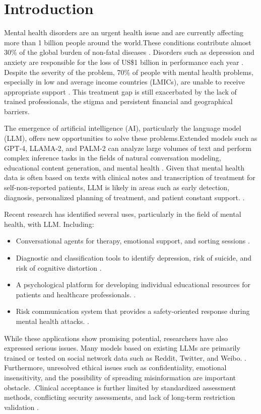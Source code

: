 \documentclass[journal]{IEEEtran}
\begin{document}
\section{Introduction}
Mental health disorders are an urgent health issue and are currently affecting more than 1 billion people around the world.These conditions contribute almost 30\% of the global burden of non-fatal diseases  \cite{WHO2022}. Disorders such as depression and anxiety are responsible for the loss of US\$1 billion in performance each year \cite{Hua2024}. Despite the severity of the problem, 70\% of people with mental health problems, especially in low and average income countries (LMICs), are unable to receive appropriate support \cite{Naslund2017}. This treatment gap is still exacerbated by the lack of trained professionals, the stigma and persistent financial and geographical barriers.

The emergence of artificial intelligence (AI), particularly the language model (LLM), offers new opportunities to solve these problems.Extended models such as GPT-4, LLAMA-2, and PALM-2 can analyze large volumes of text and perform complex inference tasks in the fields of natural conversation modeling, educational content generation, and mental health \cite{Hua2024b,JMIR2024}. Given that mental health data is often based on texts with clinical notes and transcription of treatment for self-non-reported patients, LLM is likely in areas such as early detection, diagnosis, personalized planning of treatment, and patient constant support. \cite{Ibrahimov2024,Olawade2024}.

Recent research has identified several uses, particularly in the field of mental health, with LLM. Including:
\begin{itemize}
    \item Conversational agents for therapy, emotional support, and sorting sessions  \cite{Ma2023,Liu2024,Hu2025}.
    \item Diagnostic and classification tools to identify depression, risk of suicide, and risk of cognitive distortion  \cite{Xu2024,Yang2024}.
    \item A psychological platform for developing individual educational resources for patients and healthcare professionals. \cite{Smith2023,Kumar2023}.
    \item Risk communication system that provides a safety-oriented response during mental health attacks. \cite{Hua2024b}.
\end{itemize}

While these applications show promising potential, researchers have also expressed serious issues. Many models based on existing LLMs are primarily trained or tested on social network data such as Reddit, Twitter, and Weibo. \cite{Hua2024,JMIR2024}. Furthermore, unresolved ethical issues such as confidentiality, emotional insensitivity, and the possibility of spreading misinformation are important obstacle. \cite{Minerva2023,Hodson2024}.Clinical acceptance is further limited by standardized assessment methods, conflicting security assessments, and lack of long-term restriction validation \cite{Zhong2024}.
\end{document}
